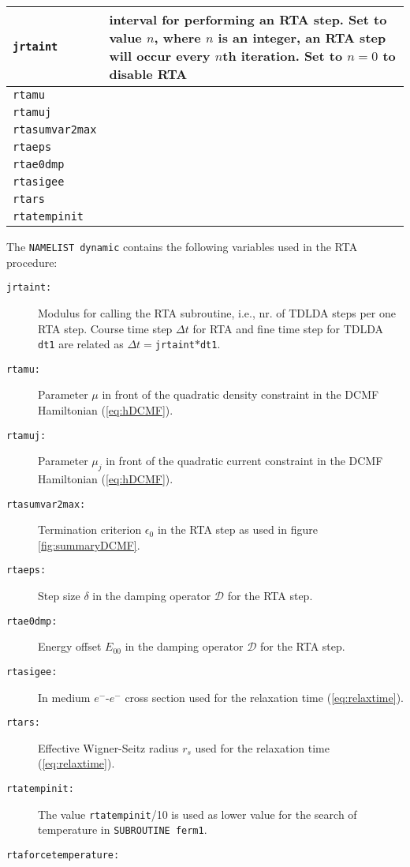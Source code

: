 \begin{tabular}{|p{3.5cm}|p{11.2cm}|}
	\hline
	\texttt{jrtaint} & interval for performing an RTA step. Set to value $n$, where $n$ is an integer, an RTA step will occur every $n$th iteration. Set to $n=0$ to disable RTA\\
	\hline
	\texttt{rtamu} & \\
	\hline
	\texttt{rtamuj} & \\
	\hline
	\texttt{rtasumvar2max} & \\
	\hline
	\texttt{rtaeps} & \\
	\hline
	\texttt{rtae0dmp} & \\
	\hline
	\texttt{rtasigee} & \\
	\hline
	\texttt{rtars} & \\
	\hline
	\texttt{rtatempinit} & \\
	\hline
\end{tabular}


The {\tt NAMELIST dynamic} contains the following variables
used in the RTA procedure:
\begin{description}
\item[\tt jrtaint:]
   Modulus for calling the RTA subroutine, i.e., nr. of TDLDA steps
   per one RTA step. Course time step $\Delta t$ for RTA and fine
   time step for TDLDA {\tt dt1} are related as
   $\Delta t=${\tt jrtaint}$*${\tt dt1}.
\item[\tt rtamu:]
   Parameter $\mu$ in front of the quadratic density constraint in the
   DCMF Hamiltonian (\ref{eq:hDCMF}).
\item[\tt rtamuj:]
   Parameter $\mu_j$ in front of the quadratic current constraint in the
   DCMF Hamiltonian (\ref{eq:hDCMF}).
\item[\tt rtasumvar2max:] Termination criterion $\epsilon_0$ in the
   RTA step as used
   in figure \ref{fig:summaryDCMF}. 
\item[\tt rtaeps:]
  Step size $\delta$ in the damping operator  $\mathcal{D}$ for the RTA step.
\item[\tt rtae0dmp:]
  Energy offset $E_00$ in the damping operator  $\mathcal{D}$ for the RTA step.
\item[\tt rtasigee:]
  In medium $e^-$-$e^-$ cross section used for the relaxation time 
  (\ref{eq:relaxtime}).
\item[\tt rtars:]
  Effective  Wigner-Seitz radius $r_s$ used for the relaxation time 
  (\ref{eq:relaxtime}).
\item[\tt rtatempinit:]
  The value {\tt rtatempinit}/10 is used as lower value for the search
  of temperature in {\tt SUBROUTINE ferm1}.
\item[\tt rtaforcetemperature:]
\end{description}
